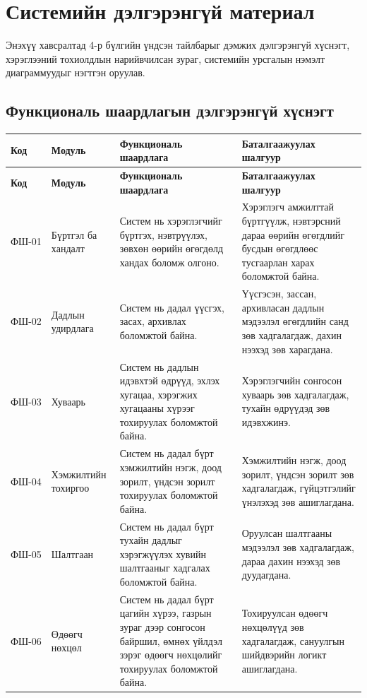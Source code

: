 \chapter{Системийн дэлгэрэнгүй материал}

Энэхүү хавсралтад 4-р бүлгийн үндсэн тайлбарыг дэмжих дэлгэрэнгүй хүснэгт, хэрэглээний тохиолдлын нарийвчилсан зураг, системийн урсгалын нэмэлт диаграммуудыг нэгтгэн оруулав.

\section{Функциональ шаардлагын дэлгэрэнгүй хүснэгт}

{\footnotesize
\setlength{\tabcolsep}{3pt}
\label{app:functional-1}
\begin{longtable}{|L{1.3cm}|L{2.5cm}|L{5.4cm}|L{4.0cm}|}
\hline
\textbf{Код} & \textbf{Модуль} & \textbf{Функциональ шаардлага} & \textbf{Баталгаажуулах шалгуур} \\
\hline
\endfirsthead
\hline
\textbf{Код} & \textbf{Модуль} & \textbf{Функциональ шаардлага} & \textbf{Баталгаажуулах шалгуур} \\
\hline
\endhead
ФШ-01 & Бүртгэл ба хандалт & Систем нь хэрэглэгчийг бүртгэх, нэвтрүүлэх, зөвхөн өөрийн өгөгдөлд хандах боломж олгоно. & Хэрэглэгч амжилттай бүртгүүлж, нэвтэрсний дараа өөрийн өгөгдлийг бусдын өгөгдлөөс тусгаарлан харах боломжтой байна. \\
\hline
ФШ-02 & Дадлын удирдлага & Систем нь дадал үүсгэх, засах, архивлах боломжтой байна. & Үүсгэсэн, зассан, архивласан дадлын мэдээлэл өгөгдлийн санд зөв хадгалагдаж, дахин нээхэд зөв харагдана. \\
\hline
ФШ-03 & Хуваарь & Систем нь дадлын идэвхтэй өдрүүд, эхлэх хугацаа, хэрэгжих хугацааны хүрээг тохируулах боломжтой байна. & Хэрэглэгчийн сонгосон хуваарь зөв хадгалагдаж, тухайн өдрүүдэд зөв идэвхжинэ. \\
\hline
ФШ-04 & Хэмжилтийн тохиргоо & Систем нь дадал бүрт хэмжилтийн нэгж, доод зорилт, үндсэн зорилт тохируулах боломжтой байна. & Хэмжилтийн нэгж, доод зорилт, үндсэн зорилт зөв хадгалагдаж, гүйцэтгэлийг үнэлэхэд зөв ашиглагдана. \\
\hline
ФШ-05 & Шалтгаан & Систем нь дадал бүрт тухайн дадлыг хэрэгжүүлэх хувийн шалтгааныг хадгалах боломжтой байна. & Оруулсан шалтгааны мэдээлэл зөв хадгалагдаж, дараа дахин нээхэд зөв дуудагдана. \\
\hline
ФШ-06 & Өдөөгч нөхцөл & Систем нь дадал бүрт цагийн хүрээ, газрын зураг дээр сонгосон байршил, өмнөх үйлдэл зэрэг өдөөгч нөхцөлийг тохируулах боломжтой байна. & Тохируулсан өдөөгч нөхцөлүүд зөв хадгалагдаж, сануулгын шийдвэрийн логикт ашиглагдана. \\

\end{longtable}}
